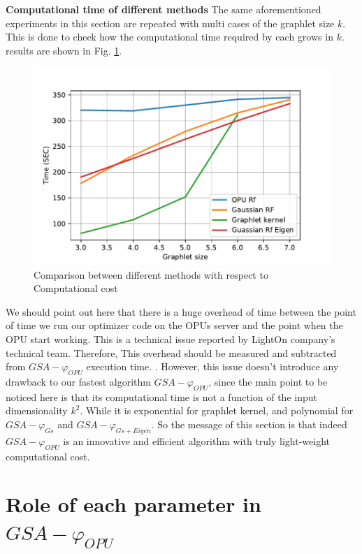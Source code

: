\textbf{Computational time of different methods}
The same aforementioned experiments in this section are repeated with multi cases of the graphlet size $k$. This is done to check how the computational time required by each grows in $k$. results are shown in Fig. \ref{fig:computational_comparison}.
\begin{figure}[H]
\centering
\includegraphics[scale=0.5]{figs/computational_comp.pdf}
\caption[Comparison in Computational cost between methods  ]{Comparison between different methods with respect to Computational cost  }
\label{fig:computational_comparison}
\end{figure}
We should point out here that there is a huge overhead of time between the point of time we run our optimizer code on the OPUs server and the point when the OPU start working. This is a technical issue reported by LightOn company's technical team.  Therefore,  This overhead should be measured and subtracted from $GSA-\varphi_{OPU}$ execution time. . However, this issue doesn't introduce any drawback to our fastest algorithm $GSA-\varphi_{OPU}$, since the main point to be noticed here is that its computational time is not a function of the input dimensionality $k^2$. While it is exponential for graphlet kernel, and polynomial for $GSA-\varphi_{Gs}$ and $GSA-\varphi_{Gs+Eigen}$. So the message of this section is that indeed $GSA-\varphi_{OPU}$ is an innovative and efficient algorithm with truly light-weight computational cost.



\section{Role of each parameter in $GSA-\varphi_{OPU}$}

